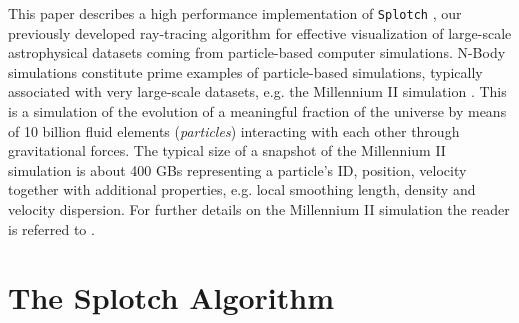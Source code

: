 This paper describes a high performance implementation of 
{\tt Splotch} \citep{2008NJPh...10l5006D}, our previously developed ray-tracing 
algorithm for effective visualization of large-scale astrophysical datasets coming 
from particle-based computer simulations. N-Body simulations constitute 
prime examples of particle-based simulations, typically associated with very 
large-scale datasets, e.g. the Millennium II simulation \citep{2009MNRAS.398.1150B}. 
This is a simulation of the evolution of a meaningful fraction of the universe 
by means of 10 billion fluid elements ({\it particles}) interacting with each other 
through gravitational forces. The typical size of a snapshot of the Millennium II 
simulation is about 400 GBs representing a particle's ID, position, velocity 
together with additional properties, e.g. local smoothing length, density and 
velocity dispersion. For further details on the Millennium II simulation the reader 
is referred to \citep{2009MNRAS.398.1150B}.



\section{The Splotch Algorithm}
\label{splotch}


